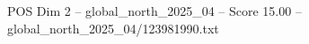 \begin{textsample}{POS Dim 2 – global\_north\_2025\_04 – Score 15.00 – global\_north\_2025\_04/123981990.txt}
\end{textsample}
